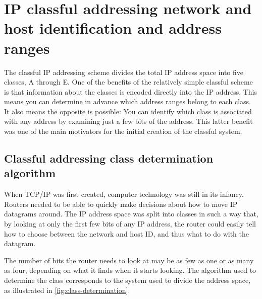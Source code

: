 \section{IP classful addressing network and host identification and address ranges}

The classful IP addressing scheme divides the total IP address space
into five classes, A through E. One of the benefits of the relatively
simple classful scheme is that information about the classes is encoded
directly into the IP address. This means you can determine in advance
which address ranges belong to each class. It also means the opposite is
possible: You can identify which class is associated with any address by
examining just a few bits of the address. This latter benefit was one of
the main motivators for the initial creation of the classful
system.\protect\hypertarget{ch17s02.htmlux5cux23idx-CHP-17-0685}{}{}


\subsection{Classful addressing class determination algorithm}

When TCP/IP was first created, computer technology was still in its
infancy. Routers needed to be able to quickly make decisions about how
to move IP datagrams around. The IP address space was split into classes
in such a way that, by looking at only the first few bits of any IP
address, the router could easily tell how to choose between the network
and host ID, and thus what to do with the datagram.

The number of bits the router needs to look at may be as few as one or
as many as four, depending on what it finds when it starts looking. The
algorithm used to determine the class corresponds to the system used to
divide the address space, as illustrated in \cref{fig:class-determination}.


